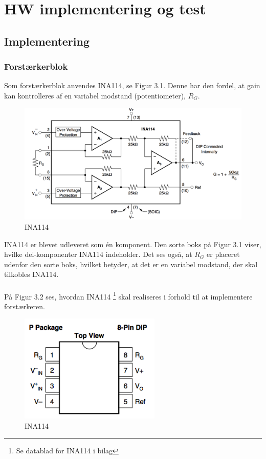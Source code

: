 \chapter{HW implementering og test}

\section{Implementering}

\subsection{Forstærkerblok}
Som forstærkerblok anvendes INA114, se Figur 3.1. Denne har den fordel, at gain kan kontrolleres af en variabel modstand (potentiometer), $R_{G}$. 

\begin{figure}[H]
	\centering
	\includegraphics[width=1\textwidth]{Figurer/Snip20151117_104}
	\caption{INA114}
\end{figure}

INA114 er blevet udleveret som én komponent. Den sorte boks på Figur 3.1 viser, hvilke del-komponenter INA114 indeholder. Det ses også, at $R_{G}$ er placeret udenfor den sorte boks, hvilket betyder, at det er en variabel modstand, der skal tilkobles INA114.  
\\
\\
På Figur 3.2 ses, hvordan INA114 \footnote{Se datablad for INA114 i bilag} skal realiseres i forhold til at implementere forstærkeren. 

\begin{figure}[H]
	\centering
	\includegraphics[width=0.6\textwidth]{Figurer/Snip20151207_47}
	\caption{INA114}
\end{figure}

